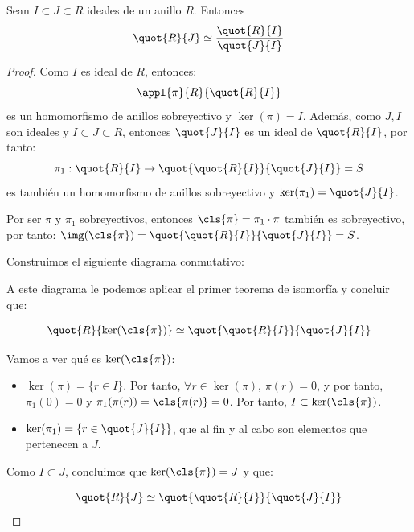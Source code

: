 
\begin{theorem} \label{thm:IsomorfiaAnillos2} Sean $I ⊂ J ⊂ R$ ideales de un anillo $R$. Entonces \[ \quot{R}{J} \simeq \frac{\quot{R}{I}}{\quot{J}{I}} \]
\end{theorem}

\begin{proof}

Como $I$ es ideal de $R$, entonces:
\[ \appl{\pi}{R}{\quot{R}{I}} \]
es un homomorfismo de anillos sobreyectivo y $\ker(\pi)=I$. Además, como $J,I$ son ideales y $I\subset J \subset R$, entonces $\quot{J}{I}$ es un ideal de $\quot{R}{I}$, por tanto:
\[
	\pi_1: \quot{R}{I} \rightarrow \quot{\quot{R}{I}}{\quot{J}{I}}=S
\]
es también un homomorfismo de anillos sobreyectivo y $\ker(\pi_1)=\quot{J}{I}$.

Por ser $\pi$ y $\pi_1$ sobreyectivos, entonces $\cls{\pi}=\pi_1\cdot\pi$ también es sobreyectivo, por tanto: $\img(\cls{\pi})=\quot{\quot{R}{I}}{\quot{J}{I}}=S$.

Construimos el siguiente diagrama conmutativo:

\begin{center}
\end{center}

A este diagrama le podemos aplicar el primer teorema de isomorfía y concluir que:

$$ \quot{R}{\ker(\cls{\pi})} \simeq  \quot{\quot{R}{I}}{\quot{J}{I}} $$

Vamos a ver qué es $\ker(\cls{\pi})$:

\begin{itemize}
	\item $\ker(\pi)=\{r \in I\}$. Por tanto, $\forall r \in \ker(\pi)$, $\pi(r)=0$, y por tanto, $\pi_1(0)=0$ y $\pi_1(\pi(r))=\cls{\pi(r)}=0$. Por tanto, $I \subset \ker(\cls{\pi})$.
	\item $\ker(\pi_1)=\{ r \in \quot{J}{I}\}$, que al fin y al cabo son elementos que pertenecen a $J$.
\end{itemize}

Como $I \subset J$, concluimos que $\ker(\cls{\pi}) = J$ y que:

$$ \quot{R}{J} \simeq  \quot{\quot{R}{I}}{\quot{J}{I}} $$

\end{proof}

